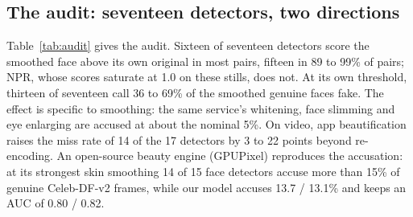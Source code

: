 \documentclass[conference,a4paper]{IEEEtran}
\begin{document}
\subsection{The audit: seventeen detectors, two directions}
\label{sec:res-audit}

Table~\ref{tab:audit} gives the audit. Sixteen of seventeen detectors score the smoothed face above its own original in most
pairs, fifteen in 89 to 99\% of pairs; NPR, whose scores saturate at 1.0 on these stills, does not. At its own threshold,
thirteen of seventeen call 36 to 69\% of the smoothed genuine faces fake. The effect is specific to smoothing: the same
service's whitening, face slimming and eye enlarging are accused at about the nominal 5\%. On video, app beautification
raises the miss rate of 14 of the 17 detectors by 3 to 22 points beyond re-encoding. An open-source beauty engine (GPUPixel)
reproduces the accusation: at its strongest skin smoothing 14 of 15 face detectors accuse more than 15\% of genuine
Celeb-DF-v2 frames, while our model accuses 13.7 / 13.1\% and keeps an AUC of 0.80 / 0.82.
\end{document}
